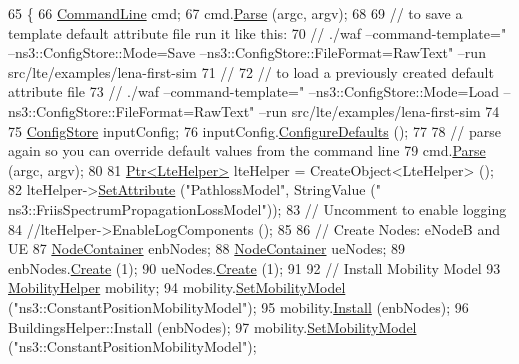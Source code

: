 \begin{DoxyCode}
65 \{       
66   \hyperlink{classns3_1_1CommandLine}{CommandLine} cmd;
67   cmd.\hyperlink{classns3_1_1CommandLine_a5c10b85b3207e5ecb48d907966923156}{Parse} (argc, argv);
68         
69   \textcolor{comment}{// to save a template default attribute file run it like this:}
70   \textcolor{comment}{// ./waf --command-template="%
       --ns3::ConfigStore::Mode=Save --ns3::ConfigStore::FileFormat=RawText" --run src/lte/examples/lena-first-sim}
71   \textcolor{comment}{//}
72   \textcolor{comment}{// to load a previously created default attribute file}
73   \textcolor{comment}{// ./waf --command-template="%
       --ns3::ConfigStore::Mode=Load --ns3::ConfigStore::FileFormat=RawText" --run src/lte/examples/lena-first-sim}
74 
75   \hyperlink{classns3_1_1ConfigStore}{ConfigStore} inputConfig;
76   inputConfig.\hyperlink{classns3_1_1ConfigStore_a0a6137574d7c847c3823af8b9d1bb886}{ConfigureDefaults} ();
77 
78   \textcolor{comment}{// parse again so you can override default values from the command line}
79   cmd.\hyperlink{classns3_1_1CommandLine_a5c10b85b3207e5ecb48d907966923156}{Parse} (argc, argv);
80 
81   \hyperlink{classns3_1_1Ptr}{Ptr<LteHelper>} lteHelper = CreateObject<LteHelper> ();
82   lteHelper->\hyperlink{classns3_1_1ObjectBase_ac60245d3ea4123bbc9b1d391f1f6592f}{SetAttribute} (\textcolor{stringliteral}{"PathlossModel"}, StringValue (\textcolor{stringliteral}{"
      ns3::FriisSpectrumPropagationLossModel"}));
83   \textcolor{comment}{// Uncomment to enable logging}
84   \textcolor{comment}{//lteHelper->EnableLogComponents ();}
85 
86   \textcolor{comment}{// Create Nodes: eNodeB and UE}
87   \hyperlink{classns3_1_1NodeContainer}{NodeContainer} enbNodes;
88   \hyperlink{classns3_1_1NodeContainer}{NodeContainer} ueNodes;
89   enbNodes.\hyperlink{classns3_1_1NodeContainer_a787f059e2813e8b951cc6914d11dfe69}{Create} (1);
90   ueNodes.\hyperlink{classns3_1_1NodeContainer_a787f059e2813e8b951cc6914d11dfe69}{Create} (1);
91 
92   \textcolor{comment}{// Install Mobility Model}
93   \hyperlink{classns3_1_1MobilityHelper}{MobilityHelper} mobility;
94   mobility.\hyperlink{classns3_1_1MobilityHelper_a030275011b6f40682e70534d30280aba}{SetMobilityModel} (\textcolor{stringliteral}{"ns3::ConstantPositionMobilityModel"});
95   mobility.\hyperlink{classns3_1_1MobilityHelper_a07737960ee95c0777109cf2994dd97ae}{Install} (enbNodes);
96   BuildingsHelper::Install (enbNodes);
97   mobility.\hyperlink{classns3_1_1MobilityHelper_a030275011b6f40682e70534d30280aba}{SetMobilityModel} (\textcolor{stringliteral}{"ns3::ConstantPositionMobilityModel"});

\end{DoxyCode}
